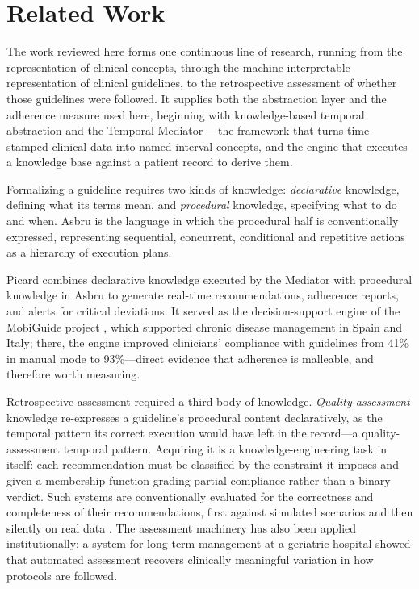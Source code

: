 \section{Related Work}
\label{sec:related-work}

The work reviewed here forms one continuous line of research, running from
the representation of clinical concepts, through the machine-interpretable
representation of clinical guidelines, to the retrospective assessment of
whether those guidelines were followed. It supplies both the abstraction
layer and the adherence measure used here, beginning with knowledge-based
temporal abstraction and the Temporal Mediator
\citep{shahar1997framework}---the framework that turns time-stamped clinical
data into named interval concepts, and the engine that executes a knowledge
base against a patient record to derive them.

Formalizing a guideline requires two kinds of knowledge: \emph{declarative}
knowledge, defining what its terms mean, and \emph{procedural} knowledge,
specifying what to do and when. Asbru
\citep{shahar1997asbru, shahar1998asgaard} is the language in which the
procedural half is conventionally expressed, representing sequential,
concurrent, conditional and repetitive actions as a hierarchy of execution
plans.

Picard
\citep{shalom2016architecture}
combines declarative knowledge executed by the Mediator with procedural
knowledge in Asbru to generate real-time recommendations, adherence reports,
and alerts for critical deviations. It served as the decision-support engine
of the MobiGuide project
\citep{peleg2022mobiguide},
which supported chronic disease management in Spain and Italy; there, the
engine improved clinicians' compliance with guidelines from 41\% in manual
mode to 93\%---direct evidence that adherence is malleable, and therefore
worth measuring.

Retrospective assessment required a third body of knowledge.
\emph{Quality-assessment} knowledge \citep{ben2024supporting} re-expresses a
guideline's procedural content declaratively, as the temporal pattern its
correct execution would have left in the record---a quality-assessment
temporal pattern. Acquiring it is a knowledge-engineering task in itself:
each recommendation must be classified by the constraint it imposes and given
a membership function grading partial compliance rather than a binary
verdict. Such systems are conventionally evaluated for the correctness and
completeness of their recommendations, first against simulated scenarios and
then silently on real data \citep{shalom2015multiple}. The assessment
machinery has also been applied institutionally: a system for long-term
management at a geriatric hospital \citep{shalom2024implementation} showed
that automated assessment recovers clinically meaningful variation in how
protocols are followed.

